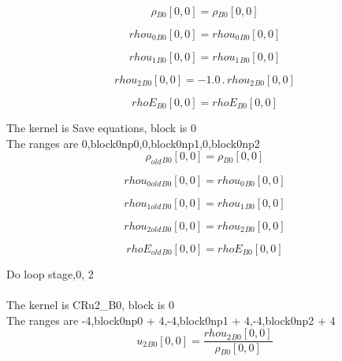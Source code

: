 \documentclass{article}
\begin{document}
\begin{dmath}{\rho{_{B0}}}[{0,0}] = {\rho{_{B0}}}[{0,0}]\end{dmath}

\begin{dmath}{rhou_{0}{_{B0}}}[{0,0}] = {rhou_{0}{_{B0}}}[{0,0}]\end{dmath}

\begin{dmath}{rhou_{1}{_{B0}}}[{0,0}] = {rhou_{1}{_{B0}}}[{0,0}]\end{dmath}

\begin{dmath}{rhou_{2}{_{B0}}}[{0,0}] = - 1.0 \,.\, {rhou_{2}{_{B0}}}[{0,0}]\end{dmath}

\begin{dmath}{rhoE{_{B0}}}[{0,0}] = {rhoE{_{B0}}}[{0,0}]\end{dmath}

\noindent The kernel is Save equations, block is 0\\\noindent The ranges are 0,block0np0,0,block0np1,0,block0np2\\\begin{dmath}{\rho_{old}{_{B0}}}[{0,0}] = {\rho{_{B0}}}[{0,0}]\end{dmath}

\begin{dmath}{rhou_{0 old}{_{B0}}}[{0,0}] = {rhou_{0}{_{B0}}}[{0,0}]\end{dmath}

\begin{dmath}{rhou_{1 old}{_{B0}}}[{0,0}] = {rhou_{1}{_{B0}}}[{0,0}]\end{dmath}

\begin{dmath}{rhou_{2 old}{_{B0}}}[{0,0}] = {rhou_{2}{_{B0}}}[{0,0}]\end{dmath}

\begin{dmath}{rhoE_{old}{_{B0}}}[{0,0}] = {rhoE{_{B0}}}[{0,0}]\end{dmath}

\noindent Do loop stage,0, 2\\
\\\noindent The kernel is CRu2_B0, block is 0\\\noindent The ranges are -4,block0np0 + 4,-4,block0np1 + 4,-4,block0np2 + 4\\\begin{dmath}{u_{2}{_{B0}}}[{0,0}] = \frac{{rhou_{2}{_{B0}}}[{0,0}]}{{\rho{_{B0}}}[{0,0}]}\end{dmath}
\end{document}
